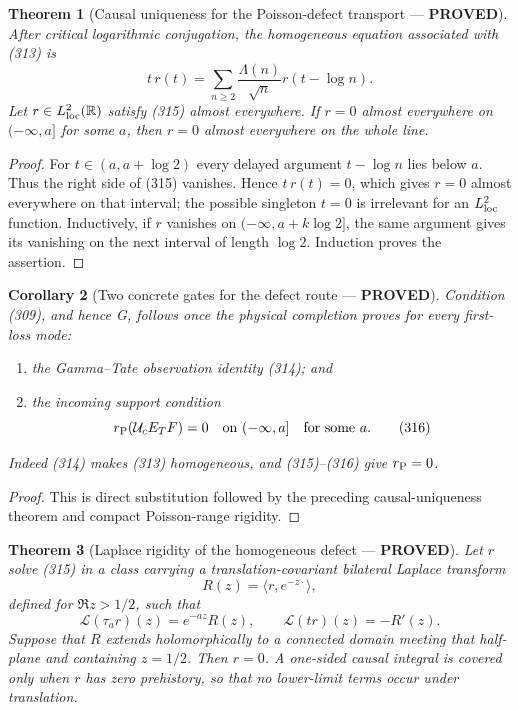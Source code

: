 \documentclass[11pt]{article}
\newtheorem{theorem}{Theorem}
\newtheorem{corollary}[theorem]{Corollary}
\newcommand{\PROVED}{\textcolor{green!45!black}{\textbf{PROVED}}}
\begin{document}
\begin{theorem}[Causal uniqueness for the Poisson-defect transport ---
\PROVED]
After critical logarithmic conjugation, the homogeneous equation associated
with (313) is
\begin{equation}
 t\,r(t)=\sum_{n\ge2}\frac{\Lambda(n)}{\sqrt n}
                   r(t-\log n).                       \tag{315}
\end{equation}
Let $r\in L^2_{\rm loc}(\mathbb R)$ satisfy (315) almost everywhere.  If
$r=0$ almost everywhere on $(-\infty,a]$ for some $a$, then $r=0$ almost
everywhere on the whole line.
\end{theorem}

\begin{proof}
For $t\in(a,a+\log2)$ every delayed argument $t-\log n$ lies below $a$.
Thus the right side of (315) vanishes.  Hence $t\,r(t)=0$, which gives
$r=0$ almost everywhere on that interval; the possible singleton $t=0$ is
irrelevant for an $L^2_{\rm loc}$ function.  Inductively, if $r$ vanishes on
$(-\infty,a+k\log2]$, the same argument gives its vanishing on the next
interval of length $\log2$.  Induction proves the assertion.
\end{proof}

\begin{corollary}[Two concrete gates for the defect route --- \PROVED]
Condition (309), and hence G, follows once the physical completion proves
for every first-loss mode:
\begin{enumerate}
\item the Gamma--Tate observation identity (314); and
\item the incoming support condition
\begin{equation}
 r_{\rm P}(\mathcal U_cE_TF)=0
 \quad\hbox{on }(-\infty,a]\quad\hbox{for some }a.     \tag{316}
\end{equation}
\end{enumerate}
Indeed (314) makes (313) homogeneous, and (315)--(316) give
$r_{\rm P}=0$.
\end{corollary}

\begin{proof}
This is direct substitution followed by the preceding causal-uniqueness
theorem and compact Poisson-range rigidity.
\end{proof}

\begin{theorem}[Laplace rigidity of the homogeneous defect --- \PROVED]
Let $r$ solve (315) in a class carrying a translation-covariant bilateral
Laplace transform
\begin{equation}
 R(z)=\langle r,e^{-z\cdot}\rangle,                    \tag{317}
\end{equation}
defined for $\Re z>1/2$, such that
\[
 \mathcal L(\tau_a r)(z)=e^{-az}R(z),
 \qquad
 \mathcal L(tr)(z)=-R'(z).
\]
Suppose that $R$ extends holomorphically to a connected domain meeting that
half-plane and containing $z=1/2$.  Then $r=0$.  A one-sided causal integral
is covered only when $r$ has zero prehistory, so that no lower-limit terms
occur under translation.
\end{theorem}
\end{document}
